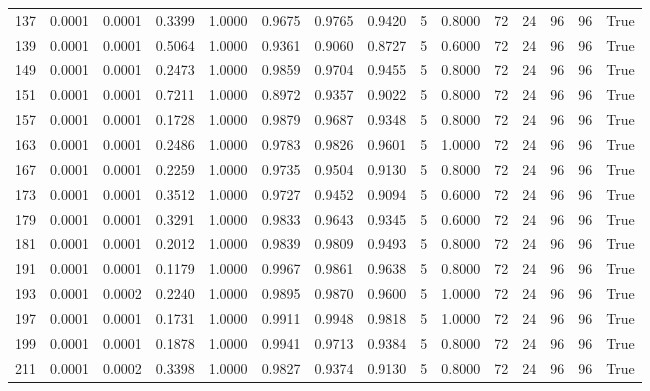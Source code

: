 \begin{tabular}{rrrrrrrrrrrrrrr}
137 & 0.0001 & 0.0001 & 0.3399 & 1.0000 & 0.9675 & 0.9765 & 0.9420 & 5 & 0.8000 & 72 & 24 & 96 & 96 & True \\
139 & 0.0001 & 0.0001 & 0.5064 & 1.0000 & 0.9361 & 0.9060 & 0.8727 & 5 & 0.6000 & 72 & 24 & 96 & 96 & True \\
149 & 0.0001 & 0.0001 & 0.2473 & 1.0000 & 0.9859 & 0.9704 & 0.9455 & 5 & 0.8000 & 72 & 24 & 96 & 96 & True \\
151 & 0.0001 & 0.0001 & 0.7211 & 1.0000 & 0.8972 & 0.9357 & 0.9022 & 5 & 0.8000 & 72 & 24 & 96 & 96 & True \\
157 & 0.0001 & 0.0001 & 0.1728 & 1.0000 & 0.9879 & 0.9687 & 0.9348 & 5 & 0.8000 & 72 & 24 & 96 & 96 & True \\
163 & 0.0001 & 0.0001 & 0.2486 & 1.0000 & 0.9783 & 0.9826 & 0.9601 & 5 & 1.0000 & 72 & 24 & 96 & 96 & True \\
167 & 0.0001 & 0.0001 & 0.2259 & 1.0000 & 0.9735 & 0.9504 & 0.9130 & 5 & 0.8000 & 72 & 24 & 96 & 96 & True \\
173 & 0.0001 & 0.0001 & 0.3512 & 1.0000 & 0.9727 & 0.9452 & 0.9094 & 5 & 0.6000 & 72 & 24 & 96 & 96 & True \\
179 & 0.0001 & 0.0001 & 0.3291 & 1.0000 & 0.9833 & 0.9643 & 0.9345 & 5 & 0.6000 & 72 & 24 & 96 & 96 & True \\
181 & 0.0001 & 0.0001 & 0.2012 & 1.0000 & 0.9839 & 0.9809 & 0.9493 & 5 & 0.8000 & 72 & 24 & 96 & 96 & True \\
191 & 0.0001 & 0.0001 & 0.1179 & 1.0000 & 0.9967 & 0.9861 & 0.9638 & 5 & 0.8000 & 72 & 24 & 96 & 96 & True \\
193 & 0.0001 & 0.0002 & 0.2240 & 1.0000 & 0.9895 & 0.9870 & 0.9600 & 5 & 1.0000 & 72 & 24 & 96 & 96 & True \\
197 & 0.0001 & 0.0001 & 0.1731 & 1.0000 & 0.9911 & 0.9948 & 0.9818 & 5 & 1.0000 & 72 & 24 & 96 & 96 & True \\
199 & 0.0001 & 0.0001 & 0.1878 & 1.0000 & 0.9941 & 0.9713 & 0.9384 & 5 & 0.8000 & 72 & 24 & 96 & 96 & True \\
211 & 0.0001 & 0.0002 & 0.3398 & 1.0000 & 0.9827 & 0.9374 & 0.9130 & 5 & 0.8000 & 72 & 24 & 96 & 96 & True \\
\bottomrule
\end{tabular}
